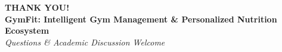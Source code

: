 \documentclass[aspectratio=169,10pt]{beamer}
\begin{document}
\begin{frame}
  \begin{center}
    \vspace{1.0cm}
    \Huge \textbf{\textcolor{GymGold}{THANK YOU!}}\\[0.6cm]
    \large \textbf{GymFit: Intelligent Gym Management \& Personalized Nutrition Ecosystem}\\[0.4cm]
    \normalsize \textit{Questions \& Academic Discussion Welcome}
    \vspace{0.8cm}
  \end{center}
\end{frame}
\end{document}
